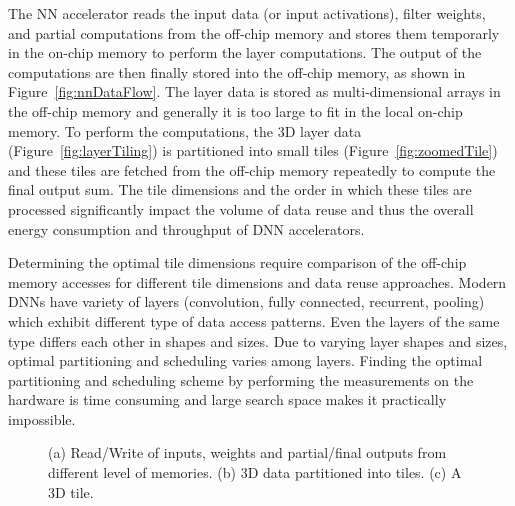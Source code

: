 \documentclass[a4paper,10pt]{article}
\begin{document}
The NN accelerator  reads the input data (or input activations), filter weights, and partial computations from the off-chip memory and stores them temporarly in the on-chip memory to perform the layer computations. The output of the computations are then finally stored into the off-chip memory, as shown in Figure~\ref{fig:nnDataFlow}. The layer data is stored as multi-dimensional arrays in the off-chip memory and generally it is too large to fit in the local on-chip memory. To perform  the computations, the 3D layer data  (Figure~\ref{fig:layerTiling}) is partitioned into small tiles (Figure~\ref{fig:zoomedTile}) and these tiles are fetched from the off-chip memory repeatedly to compute the final output sum. The tile dimensions and the order in which these tiles are processed significantly impact the volume of data reuse and thus the overall energy consumption and throughput of DNN accelerators. 

Determining the optimal tile dimensions require comparison of the off-chip memory accesses for different tile dimensions and data reuse approaches. Modern DNNs have variety of layers (convolution, fully connected, recurrent, pooling) which exhibit different type of data access patterns. Even the layers of the same type differs each other in shapes and sizes. Due to varying layer shapes and sizes, optimal partitioning and scheduling varies among layers. Finding the optimal partitioning and scheduling scheme by performing the measurements on the hardware is time consuming and large search space makes it practically impossible.
\begin{figure}[!htb]
	\centering
    \captionsetup{font=sf}
	\hfil	
	\hfil
   \hfil	
	\caption{(a) Read/Write of inputs, weights and partial/final outputs from different level of memories. (b) 3D data partitioned into tiles. (c) A 3D tile.}
	\label{fig:nnLayerData}
\end{figure}
\end{document}
